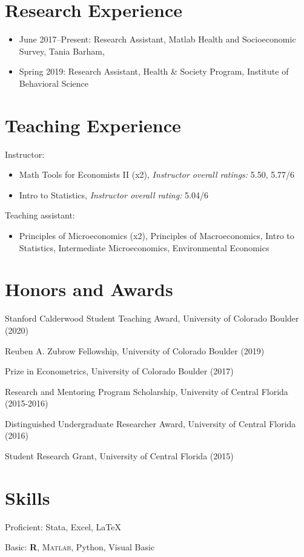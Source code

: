 \documentclass[letterpaper]{article}
\def\footerlink{}
\begin{document}
\section*{Research Experience}
\begin{itemize}
	\item[] June 2017--Present: Research Assistant, Matlab Health and Socioeconomic Survey, Tania Barham, 
	\item[] Spring 2019: Research Assistant, Health \& Society Program, Institute of Behavioral Science
\end{itemize}

\section*{Teaching Experience}
	Instructor:
\begin{itemize}
	\item[] Math Tools for Economists II (x2), \textit{Instructor overall ratings:} 5.50, 5.77/6
	\item[] Intro to Statistics, \textit{Instructor overall rating:} 5.04/6
\end{itemize}
	Teaching assistant: 
\begin{itemize}
	\item[] Principles of Microeconomics (x2), Principles of Macroeconomics, Intro to Statistics, Intermediate Microeconomics, Environmental Economics
\end{itemize}

\section*{Honors and Awards}
	Stanford Calderwood Student Teaching Award, University of Colorado Boulder (2020)

	Reuben A. Zubrow Fellowship, University of Colorado Boulder (2019)

	Prize in Econometrics, University of Colorado Boulder (2017)

	Research and Mentoring Program Scholarship, University of Central Florida (2015-2016)

	Distinguished Undergraduate Researcher Award, University of Central Florida (2016)

	Student Research Grant, University of Central Florida (2015)

\section*{Skills}
Proficient: Stata, Excel, \LaTeX

Basic: \textsf{\textbf{R}}, \textsc{Matlab}, Python, Visual Basic
\end{document}
